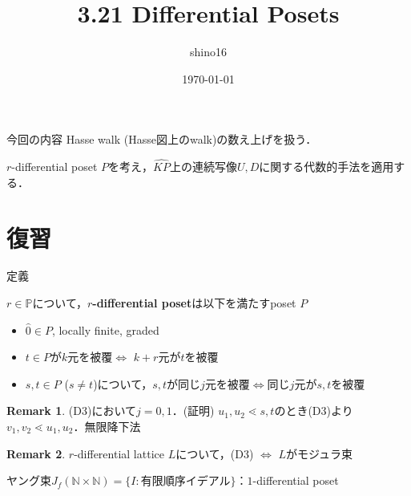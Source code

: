 \documentclass[aspectratio=98, 8pt, t]{beamer}
\title{3.21 Differential Posets}
\author{shino16}
\date{\today}
\theoremstyle{definition}
\newtheorem{remark}{Remark}
\newcommand{\bbP}{\mathbb{P}}
\newcommand{\bbN}{\mathbb{N}}
\newcommand{\wKP}{\widehat{KP}}
\begin{document}
\maketitle

\begin{frame}[c]{今回の内容}
  Hasse walk (Hasse図上のwalk)の数え上げを扱う．

  $r$-differential poset $P$を考え，$\wKP$上の連続写像$U,D$に関する代数的手法を適用する．
\end{frame}

\section{復習}

\begin{frame}{定義}
  \begin{definition}
    $r \in \bbP$について，\textbf{$r$-differential poset}は以下を満たすposet $P$ \begin{itemize}
      \item[(D1)] $\hat0 \in P$, locally finite, graded
      \item[(D2)] $t \in P$が$k$元を被覆$\iff$ $k+r$元が$t$を被覆
      \item[(D3)] $s,t \in P$ ($s \neq t$)について，$s,t$が同じ$j$元を被覆$\iff$同じ$j$元が$s,t$を被覆
    \end{itemize}
  \end{definition}
  \pause
  \begin{remark}
    (D3)において$j=0,1$．(証明) $u_1,u_2 \lessdot s,t$のとき(D3)より$v_1,v_2 \lessdot u_1,u_2$．無限降下法
  \end{remark}
  \pause
  \begin{remark}
    $r$-differential lattice $L$について，(D3) $\iff$ $L$がモジュラ束
  \end{remark}
  \pause
  \begin{example}
    ヤング束$J_f(\bbN \times \bbN) = \{I: \text{有限順序イデアル}\}$：$1$-differential poset
  \end{example}
\end{frame}
\end{document}
